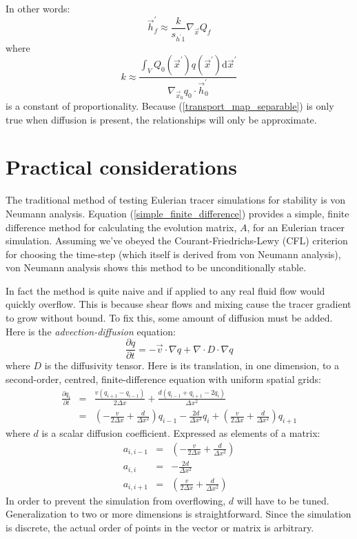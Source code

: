 \documentclass[11pt]{article}
\begin{document}
In other words:
\begin{equation}
	\vec h_f^\prime \approx \frac{k}{s_{h^\prime1}} \nabla_{\vec x} Q_f
\end{equation}
where
\begin{equation}
	k \approx \frac{\int_V Q_0 (\vec x^\prime) q(\vec x^\prime) \mathrm d \vec x^\prime}
	{\nabla_{\vec x_0} q_0 \cdot \vec h_0^\prime}
\end{equation}
is a constant of proportionality.
Because (\ref{transport_map_separable}) is only true when diffusion is present,
the relationships will only be approximate.

\section{Practical considerations}

The traditional method of testing Eulerian tracer simulations for stability
is von Neumann analysis.
Equation (\ref{simple_finite_difference}) provides a simple, finite
difference method for
calculating the evolution matrix, $A$, for an Eulerian tracer simulation.
Assuming we've obeyed the Courant-Friedrichs-Lewy (CFL) criterion for choosing
the time-step (which itself is derived from von Neumann analysis), von Neumann
analysis shows this method to be unconditionally stable.

In fact the method is quite naive and if applied to any real fluid flow would 
quickly overflow.
This is because shear flows and mixing cause the tracer gradient to grow without bound.
To fix this, some amount of diffusion must be added.  Here is the 
{\it advection-diffusion} equation:
\begin{equation}
\frac{\partial q}{\partial t} = - \vec v \cdot \nabla q + \nabla \cdot D \cdot \nabla q
\end{equation}
where $D$ is the diffusivity tensor.
Here is its translation, in one dimension, to a second-order, centred,
finite-difference equation with uniform spatial grids:
\begin{eqnarray}
\frac{\partial q_i}{\partial t} & = & \frac{v(q_{i+1} - q_{i-1})}{2 \Delta x} +
	\frac{d (q_{i-1} + q_{i+1} - 2 q_i)}{\Delta x^2} \\
& = & \left (- \frac{v}{2 \Delta x} + \frac{d}{\Delta x^2} \right ) q_{i-1} -
	\frac{2 d}{\Delta x^2} q_i + 
	\left (\frac{v}{2 \Delta x} + \frac{d}{\Delta x^2} \right ) q_{i+1}
\end{eqnarray}
where $d$ is a scalar diffusion coefficient.
Expressed as elements of a matrix:
\begin{eqnarray}
a_{i,i-1} & = & \left (- \frac{v}{2 \Delta x} + \frac{d}{\Delta x^2} \right ) \\
	a_{i,i} & = & -\frac{2 d}{\Delta x^2} \\
a_{i,i+1} & = & \left (\frac{v}{2 \Delta x} + \frac{d}{\Delta x^2} \right )
\end{eqnarray}
In order to prevent the simulation from overflowing, $d$ will have to be tuned.
Generalization to two or more dimensions is straightforward.
Since the simulation is discrete, the actual order of points in the
vector or matrix is arbitrary.
\end{document}
